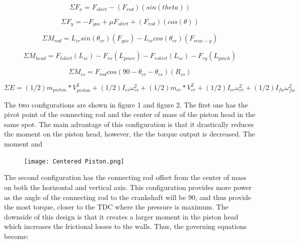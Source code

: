\documentclass[10pt,a4paper]{article}
\begin{document}
\begin{equation}
\Sigma F_x= F_{skirt} -( F_{rod})(sin(theta))
\end{equation}

\begin{equation}
\Sigma F_y= -F_{gas} + \mu F_{skirt} + ( F_{rod})(cos(\theta))
\end{equation}

\begin{equation}
\Sigma M_{rod}= L_{cr}sin(\theta_{cr})(F_{gas}) - L_{cr}cos(\theta_{cr})(F_{reac-y})
\end{equation}

\begin{equation}
\Sigma M_{head}= F_{lskirt}(L_{sc}) - F_{rx}(L_{pmcv}) - F_{rskirt}(L_{sc}) - F_{ry}(L_{pmch})
\end{equation}

\begin{equation}
\Sigma M_{cs} = F_{rod}cos(90-\theta_{cr} - \theta_{cs})(R_{cs})
\end{equation}

\begin{equation}
\Sigma E = (1/2)m_{piston}*V_{piston}^2 + (1/2)I_{cs}\omega_{cs}^2+(1/2)m_{cr}*V_{cr}^2+ (1/2)I_{cr}\omega_{cr}^2+(1/2)I_{fw}\omega_{fw}^2
\end{equation}

The two configurations are shown in figure 1 and figure 2. The first one has the pivot point
of the connecting rod and the center of mass of the piston head in the same
spot. The main advantage of this configuration is that it drastically reduces the
moment on the piston head, however, the the torque output is decreased. The moment and \\

\begin{figure}[H]
		\centering
		\texttt{[image: Centered Piston.png]}
	\end{figure}




The second configuration has the connecting rod offset from the center of
mass on both the horizontal and vertical axis. This configuration provides more
power as the angle of the connecting rod to the crankshaft will be 90, and thus
provide the most torque, closer to the TDC where the pressure is maximum.
The downside of this design is that it creates a larger moment in the piston
head which increases the frictional losses to the walls. Thus, the governing equations become:\\
\end{document}
